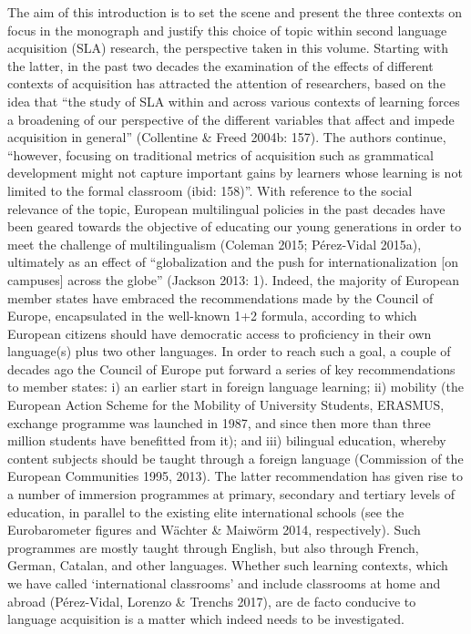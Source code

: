 \begin{styleStandard}
The aim of this introduction is to set the scene and present the three contexts on focus in the monograph and justify this choice of topic within second language acquisition (SLA) research, the perspective taken in this volume. Starting with the latter, in the past two decades the examination of the effects of different contexts of acquisition has attracted the attention of researchers, based on the idea that “the study of SLA within and across various contexts of learning forces a broadening of our perspective of the different variables that affect and impede acquisition in general” (Collentine \& Freed 2004b: 157). The authors continue, “however, focusing on traditional metrics of acquisition such as grammatical development might not capture important gains by learners whose learning is not limited to the formal classroom (ibid: 158)”. With reference to the social relevance of the topic, European multilingual policies in the past decades have been geared towards the objective of educating our young generations in order to meet the challenge of multilingualism (Coleman 2015; Pérez-Vidal 2015a), ultimately as an effect of “globalization and the push for internationalization [on campuses] across the globe” (Jackson 2013: 1). Indeed, the majority of European member states have embraced the recommendations made by the Council of Europe, encapsulated in the well-known 1+2 formula, according to which European citizens should have democratic access to proficiency in their own language(s) plus two other languages. In order to reach such a goal, a couple of decades ago the Council of Europe put forward a series of key recommendations to member states: i) an earlier start in foreign language learning; ii) mobility (the European Action Scheme for the Mobility of University Students, ERASMUS, exchange programme was launched in 1987, and since then more than three million students have benefitted from it); and iii) bilingual education, whereby content subjects should be taught through a foreign language (Commission of the European Communities 1995, 2013). The latter recommendation has given rise to a number of immersion programmes at primary, secondary and tertiary levels of education, in parallel to the existing elite international schools (see the Eurobarometer figures and Wächter \& Maiwörm 2014, respectively). Such programmes are mostly taught through English, but also through French, German, Catalan, and other languages. Whether such learning contexts, which we have called ‘international classrooms’ and include classrooms at home and abroad (Pérez-Vidal, Lorenzo \& Trenchs 2017), are de facto conducive to language acquisition is a matter which indeed needs to be investigated. 
\end{styleStandard}

